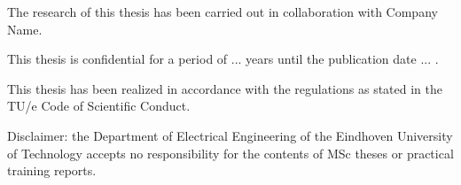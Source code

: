 \documentclass[12pt,a4paper]{article}
\begin{document}
\vspace{1cm}

{\small The research of this thesis has been carried out in collaboration with Company Name.}

\vspace{0.4cm}
{\small This thesis is confidential for a period of ... years until the publication date ... .}

\vspace{0.4cm}
{\small This thesis has been realized in accordance with the regulations as stated in the TU/e Code of Scientific Conduct.}

\vspace{0.4cm}

{\small Disclaimer: the Department of Electrical Engineering of the Eindhoven University of Technology accepts no responsibility for the contents of MSc theses or practical training reports.}

\vfill
\end{document}
